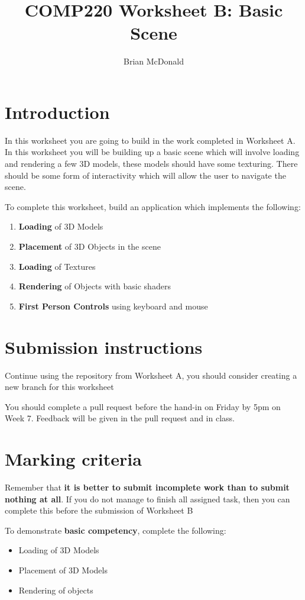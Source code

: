 \documentclass{../../../fal_assignment}
\title{COMP220 Worksheet B: Basic Scene}
\author{Brian McDonald}
\begin{document}
\maketitle

\section*{Introduction}

In this worksheet you are going to build in the work completed in Worksheet A. In this worksheet you will be building up a basic scene which will involve loading and rendering a few 3D models, these models should have some texturing. There should be some form of interactivity which will allow the user to navigate the scene.

To complete this worksheet, build an application which implements the following:
\begin{enumerate}[label=(\alph*)]
	\item \textbf{Loading} of 3D Models
	\item \textbf{Placement} of 3D Objects in the scene
	\item \textbf{Loading} of Textures
	\item \textbf{Rendering} of Objects with basic shaders
	\item \textbf{First Person Controls} using keyboard and mouse
\end{enumerate}

\section*{Submission instructions}

Continue using the repository from Worksheet A, you should consider creating a new branch for this worksheet

You should complete a pull request before the hand-in on Friday by 5pm on Week 7. Feedback will be given in the pull request and in class.

\section*{Marking criteria}

Remember that \textbf{it is better to submit incomplete work than to submit nothing at all}. If you do not manage to finish all assigned task, then you can complete this before the submission of Worksheet B

To demonstrate \textbf{basic competency}, complete the following:
\begin{itemize}
	\item Loading of 3D Models
	\item Placement of 3D Models
	\item Rendering of objects
\end{itemize} 
\end{document}
